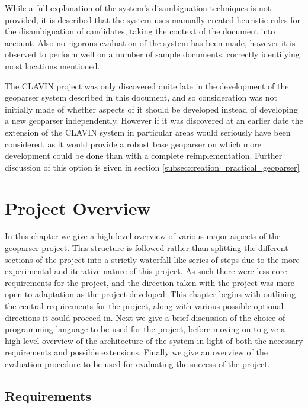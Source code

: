 \documentclass[12pt, a4paper]{report}
\begin{document}
While a full explanation of the system's disambiguation techniques is not provided, it is described that the system uses manually created heuristic rules for the disambiguation of candidates, taking the context of the document into account. Also no rigorous evaluation of the system has been made, however it is observed to perform well on a number of sample documents, correctly identifying most locations mentioned.

The CLAVIN project was only discovered quite late in the development of the geoparser system described in this document, and so consideration was not initially made of whether aspects of it should be developed instead of developing a new geoparser independently. However if it was discovered at an earlier date the extension of the CLAVIN system in particular areas would seriously have been considered, as it would provide a robust base geoparser on which more development could be done than with a complete reimplementation. Further discussion of this option is given in section \ref{subsec:creation_practical_geoparser} 

\chapter{Project Overview}

In this chapter we give a high-level overview of various major aspects of the geoparser project. This structure is followed rather than splitting the different sections of the project into a strictly waterfall-like series of steps due to the more experimental and iterative nature of this project. As such there were less core requirements for the project, and the direction taken with the project was more open to adaptation as the project developed. This chapter begins with outlining the central requirements for the project, along with various possible optional directions it could proceed in. Next we give a brief discussion of the choice of programming language to be used for the project, before moving on to give a high-level overview of the architecture of the system in light of both the necessary requirements and possible extensions. Finally we give an overview of the evaluation procedure to be used for evaluating the success of the project.

\section{Requirements}
\label{sec:requirements}
\end{document}
